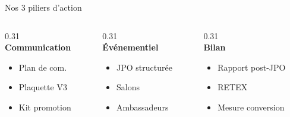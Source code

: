\documentclass[10pt,aspectratio=169]{beamer}
\begin{document}
\begin{frame}[shrink=10]{Nos 3 piliers d'action}
    \vspace{0.2cm}
    \begin{columns}[T]
        \begin{column}{0.31\textwidth}
            \centering
            {\Large\color{ensarorange}}\\[0.1cm]
            \textbf{\normalsize Communication}\\[0.1cm]
            {\small\color{ensardark}
            \begin{itemize}
                \item Plan de com.
                \item Plaquette V3
                \item Kit promotion
            \end{itemize}}
        \end{column}

        \begin{column}{0.31\textwidth}
            \centering
            {\Large\color{ensarorange}}\\[0.1cm]
            \textbf{\normalsize Événementiel}\\[0.1cm]
            {\small\color{ensardark}
            \begin{itemize}
                \item JPO structurée
                \item Salons
                \item Ambassadeurs
            \end{itemize}}
        \end{column}

        \begin{column}{0.31\textwidth}
            \centering
            {\Large\color{ensarorange}}\\[0.1cm]
            \textbf{\normalsize Bilan}\\[0.1cm]
            {\small\color{ensardark}
            \begin{itemize}
                \item Rapport post-JPO
                \item RETEX
                \item Mesure conversion
            \end{itemize}}
        \end{column}
    \end{columns}
\end{frame}
\end{document}
